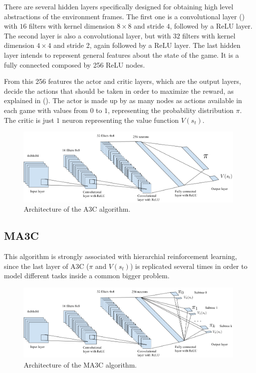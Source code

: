 There are several hidden layers specifically designed for obtaining high level abstractions of the environment frames.
The first one is a convolutional layer () with $16$ filters with kernel dimension $8 \times 8$ and stride $4$,
followed by a \ac{ReLU} layer.
The second layer is also a convolutional layer, but with $32$ filters with kernel dimension $4 \times 4$ and stride 2,
again followed by a \ac{ReLU} layer.
The last hidden layer intends to represent general features about the state of the game.
It is a fully connected composed by 256 ReLU nodes.

From this 256 features the actor and critic layers, which are the output layers, decide the actions that should be taken
in order to maximize the reward, as explained in ().
The actor is made up by as many nodes as actions available in each game with values from $0$ to $1$, representing the
probability distribution $\pi$.
The critic is just $1$ neuron representing the value function $V(s_t)$.

\begin{figure}[hbtp]
\begin{center}
\includegraphics[width=430]{img/A3C_architecture.png}
\end{center}
\caption[A3C architecture]
{Architecture of the \ac{A3C} algorithm.}
\label{fig:A3C}
\end{figure}

\subsection{\acl{MA3C}\label{subsec:MA3C}}

This algorithm is strongly associated with hierarchial reinforcement learning, since the last layer of \ac{A3C}
($\pi$ and $V(s_t)$) is replicated several times in order to model different tasks inside a common bigger problem.

\begin{figure}[hbtp]
\begin{center}
\includegraphics[width=430]{img/MA3C_architecture.png}
\end{center}
\caption[MA3C architecture]
{Architecture of the \ac{MA3C} algorithm.}
\label{fig:MA3C}
\end{figure}

